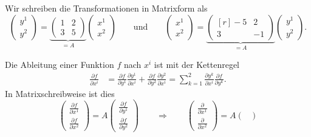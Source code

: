 \begin{loesung}
Wir schreiben die Transformationen in Matrixform als
\[
\begin{pmatrix}
y^1\\y^2
\end{pmatrix}
=
\underbrace{
\begin{pmatrix}
1&2\\ 3&5
\end{pmatrix}
}_{\displaystyle = A}
\begin{pmatrix}
x^1\\x^2
\end{pmatrix}
\qquad\text{und}\qquad
\begin{pmatrix}
x^1\\x^2
\end{pmatrix}
=
\underbrace{
\begin{pmatrix*}[r]
-5&2\\ 3&-1
\end{pmatrix*}
}_{\displaystyle = A}
\begin{pmatrix}
y^1\\y^2
\end{pmatrix}.
\]
\begin{teilaufgaben}
\item Die Ableitung einer Funktion $f$ nach $x^i$ ist mit der
Kettenregel
\begin{align*}
\frac{\partial f}{\partial x^i}
&=
\frac{\partial f}{\partial y^1}\frac{\partial y^1}{\partial x^i}
+
\frac{\partial f}{\partial y^2}\frac{\partial y^2}{\partial x^i}
=
\sum_{k=1}^2
\frac{\partial y^k}{\partial x^i}
\frac{\partial f}{\partial y^k}.
\end{align*}
In Matrixschreibweise ist dies
\begin{equation}
\renewcommand{\arraystretch}{1.8}
\begin{pmatrix}
\displaystyle \frac{\partial f}{\partial x^1}\\
\displaystyle \frac{\partial f}{\partial x^2}
\end{pmatrix}
=
A
\begin{pmatrix}
\displaystyle \frac{\partial f}{\partial y^1}\\
\displaystyle \frac{\partial f}{\partial y^2}
\end{pmatrix}
\qquad\Rightarrow\qquad
\begin{pmatrix}
\displaystyle \frac{\partial }{\partial x^1}\\
\displaystyle \frac{\partial }{\partial x^2}
\end{pmatrix}
=
A
\begin{pmatrix}

\end{pmatrix}
\end{equation}
\end{teilaufgaben}
\end{loesung}
